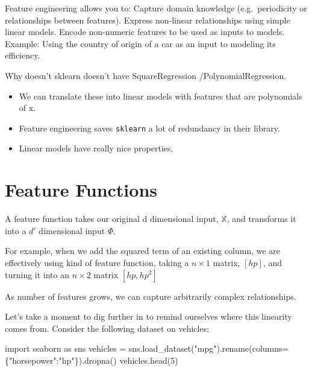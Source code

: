 \documentclass[
  letterpaper,
  DIV=11,
  numbers=noendperiod]{scrreprt}
\newenvironment{Shaded}{\begin{snugshade}}{\end{snugshade}}
\newcommand{\DecValTok}[1]{\textcolor[rgb]{0.68,0.00,0.00}{#1}}
\newcommand{\ImportTok}[1]{\textcolor[rgb]{0.00,0.46,0.62}{#1}}
\newcommand{\NormalTok}[1]{\textcolor[rgb]{0.00,0.23,0.31}{#1}}
\newcommand{\OperatorTok}[1]{\textcolor[rgb]{0.37,0.37,0.37}{#1}}
\newcommand{\StringTok}[1]{\textcolor[rgb]{0.13,0.47,0.30}{#1}}
\providecommand{\tightlist}{%
  \setlength{\itemsep}{0pt}\setlength{\parskip}{0pt}}\usepackage{longtable,booktabs,array}
\begin{document}
Feature engineering allows you to: Capture domain knowledge
(e.g.~periodicity or relationships between features). Express non-linear
relationships using simple linear models. Encode non-numeric features to
be used as inputs to models. Example: Using the country of origin of a
car as an input to modeling its efficiency.

Why doesn't sklearn doesn't have SquareRegression /PolynomialRegression.

\begin{itemize}
\tightlist
\item
  We can translate these into linear models with features that are
  polynomials of x.
\item
  Feature engineering saves \texttt{sklearn} a lot of redundancy in
  their library.
\item
  Linear models have really nice properties.
\end{itemize}

\hypertarget{feature-functions}{%
\section{Feature Functions}\label{feature-functions}}

A feature function takes our original d dimensional input,
\(\mathbb{X}\), and transforms it into a \(d'\) dimensional input
\(\Phi\).

For example, when we add the squared term of an existing column, we are
effectively using kind of feature function, taking a \(n \times 1\)
matrix, \([hp]\), and turning it into an \(n \times 2\) matrix
\([hp,hp^2]\)

As number of features grows, we can capture arbitrarily complex
relationships.

Let's take a moment to dig further in to remind ourselves where this
linearity comes from. Consider the following dataset on vehicles:

\begin{Shaded}
\begin{Highlighting}[]
\ImportTok{import}\NormalTok{ seaborn }\ImportTok{as}\NormalTok{ sns}
\NormalTok{vehicles }\OperatorTok{=}\NormalTok{ sns.load\_dataset(}\StringTok{"mpg"}\NormalTok{).rename(columns}\OperatorTok{=}\NormalTok{\{}\StringTok{"horsepower"}\NormalTok{:}\StringTok{"hp"}\NormalTok{\}).dropna()}
\NormalTok{vehicles.head(}\DecValTok{5}\NormalTok{)}
\end{Highlighting}
\end{Shaded}
\end{document}
